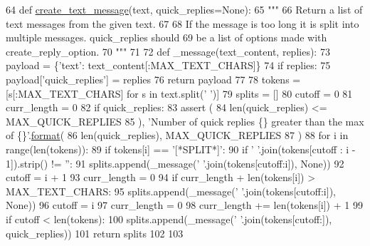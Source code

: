 \begin{DoxyCode}
64 \textcolor{keyword}{def }\hyperlink{namespaceparlai_1_1chat__service_1_1services_1_1messenger_1_1message__sender_a4c32dfd7947a473a730b81e9356e3513}{create\_text\_message}(text, quick\_replies=None):
65     \textcolor{stringliteral}{"""}
66 \textcolor{stringliteral}{    Return a list of text messages from the given text.}
67 \textcolor{stringliteral}{}
68 \textcolor{stringliteral}{    If the message is too long it is split into multiple messages. quick\_replies should}
69 \textcolor{stringliteral}{    be a list of options made with create\_reply\_option.}
70 \textcolor{stringliteral}{    """}
71 
72     \textcolor{keyword}{def }\_message(text\_content, replies):
73         payload = \{\textcolor{stringliteral}{'text'}: text\_content[:MAX\_TEXT\_CHARS]\}
74         \textcolor{keywordflow}{if} replies:
75             payload[\textcolor{stringliteral}{'quick\_replies'}] = replies
76         \textcolor{keywordflow}{return} payload
77 
78     tokens = [s[:MAX\_TEXT\_CHARS] \textcolor{keywordflow}{for} s \textcolor{keywordflow}{in} text.split(\textcolor{stringliteral}{' '})]
79     splits = []
80     cutoff = 0
81     curr\_length = 0
82     \textcolor{keywordflow}{if} quick\_replies:
83         \textcolor{keyword}{assert} (
84             len(quick\_replies) <= MAX\_QUICK\_REPLIES
85         ), \textcolor{stringliteral}{'Number of quick replies \{\} greater than the max of \{\}'}.\hyperlink{namespaceparlai_1_1chat__service_1_1services_1_1messenger_1_1shared__utils_a32e2e2022b824fbaf80c747160b52a76}{format}(
86             len(quick\_replies), MAX\_QUICK\_REPLIES
87         )
88     \textcolor{keywordflow}{for} i \textcolor{keywordflow}{in} range(len(tokens)):
89         \textcolor{keywordflow}{if} tokens[i] == \textcolor{stringliteral}{'[*SPLIT*]'}:
90             \textcolor{keywordflow}{if} \textcolor{stringliteral}{' '}.join(tokens[cutoff : i - 1]).strip() != \textcolor{stringliteral}{''}:
91                 splits.append(\_message(\textcolor{stringliteral}{' '}.join(tokens[cutoff:i]), \textcolor{keywordtype}{None}))
92                 cutoff = i + 1
93                 curr\_length = 0
94         \textcolor{keywordflow}{if} curr\_length + len(tokens[i]) > MAX\_TEXT\_CHARS:
95             splits.append(\_message(\textcolor{stringliteral}{' '}.join(tokens[cutoff:i]), \textcolor{keywordtype}{None}))
96             cutoff = i
97             curr\_length = 0
98         curr\_length += len(tokens[i]) + 1
99     \textcolor{keywordflow}{if} cutoff < len(tokens):
100         splits.append(\_message(\textcolor{stringliteral}{' '}.join(tokens[cutoff:]), quick\_replies))
101     \textcolor{keywordflow}{return} splits
102 
103 
\end{DoxyCode}


